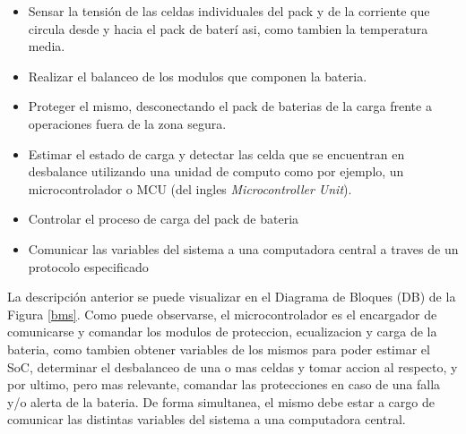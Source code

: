 \documentclass[10pt,a4paper]{article}
\begin{document}
	\begin{itemize}
		\item Sensar la tensión de las celdas individuales del pack y de la 
        corriente que circula desde y hacia el pack de baterí asi, como tambien 
        la temperatura media.
		\item Realizar el balanceo de los modulos que componen la bateria.
		\item Proteger el mismo, desconectando el pack de baterias de la carga
            frente a operaciones fuera de la zona segura.
		\item Estimar el estado de carga y detectar las celda que se encuentran
            en desbalance utilizando una unidad de computo como por ejemplo, un
            microcontrolador o MCU (del ingles \emph{Microcontroller Unit}).
        \item Controlar el proceso de carga del pack de bateria
        \item Comunicar las variables del sistema a una computadora central a
        traves de un protocolo especificado
	\end{itemize}
	
	\noindent La descripción anterior se puede visualizar en el Diagrama de 
    Bloques (DB) de la Figura \ref{bms}. Como puede observarse, 
    el microcontrolador es el encargador de comunicarse y comandar los modulos 
    de proteccion, ecualizacion y carga de la bateria, como tambien obtener 
    variables de los mismos para poder estimar el SoC, determinar el 
    desbalanceo de una o mas celdas y tomar accion al respecto, y por ultimo, 
    pero mas relevante, comandar las protecciones en caso de una falla y/o 
    alerta de la bateria. De forma simultanea, el mismo debe estar a cargo de 
    comunicar las distintas variables del sistema a una computadora central.

    \clearpage
\end{document}
